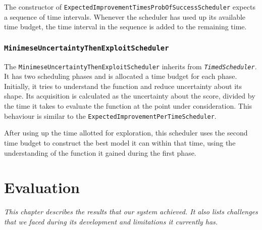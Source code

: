\documentclass[a4paper,12pt,twoside,openright]{report}
\begin{document}
The constructor of \texttt{ExpectedImprovementTimesProbOfSuccessScheduler} expects a sequence of time intervals. Whenever the scheduler has used up its available time budget, the time interval in the sequence is added to the remaining time. %

\subsection{\texttt{MinimeseUncertaintyThenExploitScheduler}}
The \texttt{MinimeseUncertaintyThenExploitScheduler} inherits from \texttt{\textit{TimedScheduler}}. It has two scheduling phases and is allocated a time budget for each phase. Initially, it tries to understand the function and reduce uncertainty about its shape. Its acquisition is calculated as the uncertainty about the score, divided by the time it takes to evaluate the function at the point under consideration. This behaviour is similar to the \texttt{ExpectedImprovementPerTimeScheduler}.

After using up the time allotted for exploration, this scheduler uses the second time budget to construct the best model it can within that time, using the understanding of the function it gained during the first phase.




\chapter{Evaluation}
\textit{This chapter describes the results that our system achieved. It also lists challenges that we faced during its development and limitations it currently has.}



 
\end{document}
